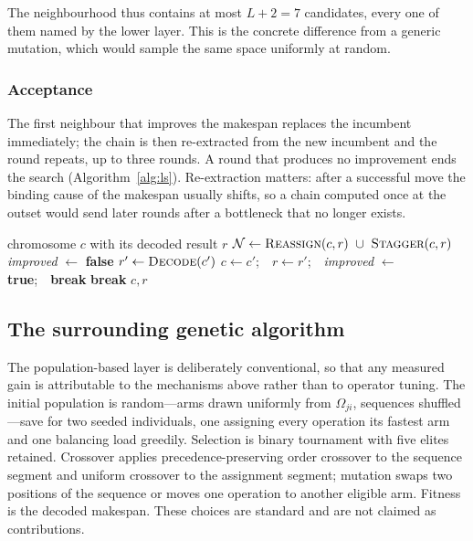 \documentclass[manuscript,screen,review]{acmart}
\begin{document}
The neighbourhood thus contains at most $L+2=7$ candidates, every one of them
named by the lower layer. This is the concrete difference from a generic
mutation, which would sample the same space uniformly at random.

\subsubsection{Acceptance}
The first neighbour that improves the makespan replaces the incumbent
immediately; the chain is then re-extracted from the new incumbent and the
round repeats, up to three rounds. A round that produces no improvement ends
the search (Algorithm~\ref{alg:ls}). Re-extraction matters: after a successful
move the binding cause of the makespan usually shifts, so a chain computed once
at the outset would send later rounds after a bottleneck that no longer exists.

\begin{algorithm}[t]
\caption{\textsc{ContentionGuidedSearch}}
\label{alg:ls}
\small
\begin{algorithmic}[1]
\Require chromosome $c$ with its decoded result $r$
  \State $\mathcal{N}\gets\textsc{Reassign}(c,r)\ \cup\ \textsc{Stagger}(c,r)$
  \State \textit{improved} $\gets$ \textbf{false}
    \State $r'\gets\textsc{Decode}(c')$
      \State $c\gets c'$;\ \ $r\gets r'$;\ \ \textit{improved} $\gets$
             \textbf{true};\ \ \textbf{break}
    \EndIf
  \EndFor
   \State \textbf{break} \EndIf
\EndFor
\State \Return $c,r$
\end{algorithmic}
\end{algorithm}

\subsection{The surrounding genetic algorithm}

The population-based layer is deliberately conventional, so that any measured
gain is attributable to the mechanisms above rather than to operator tuning.
The initial population is random---arms drawn uniformly from $\Omega_{ji}$,
sequences shuffled---save for two seeded individuals, one assigning every
operation its fastest arm and one balancing load greedily. Selection is binary
tournament with five elites retained. Crossover applies precedence-preserving
order crossover to the sequence segment and uniform crossover to the assignment
segment; mutation swaps two positions of the sequence or moves one operation to
another eligible arm. Fitness is the decoded makespan. These choices are
standard and are not claimed as contributions.
\end{document}
